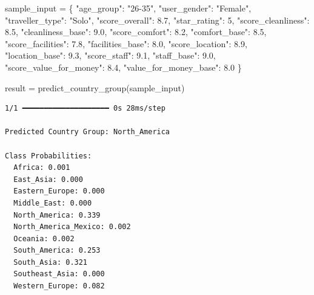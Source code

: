 \documentclass[
  letterpaper,
  DIV=11,
  numbers=noendperiod]{scrartcl}
\newenvironment{Shaded}{\begin{snugshade}}{\end{snugshade}}
\newcommand{\DecValTok}[1]{\textcolor[rgb]{0.68,0.00,0.00}{#1}}
\newcommand{\FloatTok}[1]{\textcolor[rgb]{0.68,0.00,0.00}{#1}}
\newcommand{\NormalTok}[1]{\textcolor[rgb]{0.00,0.23,0.31}{#1}}
\newcommand{\OperatorTok}[1]{\textcolor[rgb]{0.37,0.37,0.37}{#1}}
\newcommand{\StringTok}[1]{\textcolor[rgb]{0.13,0.47,0.30}{#1}}
\begin{document}
\begin{Shaded}
\begin{Highlighting}[]
\NormalTok{sample\_input }\OperatorTok{=}\NormalTok{ \{}
    \StringTok{"age\_group"}\NormalTok{: }\StringTok{"26{-}35"}\NormalTok{,}
    \StringTok{"user\_gender"}\NormalTok{: }\StringTok{"Female"}\NormalTok{,}
    \StringTok{"traveller\_type"}\NormalTok{: }\StringTok{"Solo"}\NormalTok{,}
    \StringTok{"score\_overall"}\NormalTok{: }\FloatTok{8.7}\NormalTok{,}
    \StringTok{"star\_rating"}\NormalTok{: }\DecValTok{5}\NormalTok{,}
    \StringTok{"score\_cleanliness"}\NormalTok{: }\FloatTok{8.5}\NormalTok{,}
    \StringTok{"cleanliness\_base"}\NormalTok{: }\FloatTok{9.0}\NormalTok{,}
    \StringTok{"score\_comfort"}\NormalTok{: }\FloatTok{8.2}\NormalTok{,}
    \StringTok{"comfort\_base"}\NormalTok{: }\FloatTok{8.5}\NormalTok{,}
    \StringTok{"score\_facilities"}\NormalTok{: }\FloatTok{7.8}\NormalTok{,}
    \StringTok{"facilities\_base"}\NormalTok{: }\FloatTok{8.0}\NormalTok{,}
    \StringTok{"score\_location"}\NormalTok{: }\FloatTok{8.9}\NormalTok{,}
    \StringTok{"location\_base"}\NormalTok{: }\FloatTok{9.3}\NormalTok{,}
    \StringTok{"score\_staff"}\NormalTok{: }\FloatTok{9.1}\NormalTok{,}
    \StringTok{"staff\_base"}\NormalTok{: }\FloatTok{9.0}\NormalTok{,}
    \StringTok{"score\_value\_for\_money"}\NormalTok{: }\FloatTok{8.4}\NormalTok{,}
    \StringTok{"value\_for\_money\_base"}\NormalTok{: }\FloatTok{8.0}
\NormalTok{\}}

\NormalTok{result }\OperatorTok{=}\NormalTok{ predict\_country\_group(sample\_input)}
\end{Highlighting}
\end{Shaded}

\begin{verbatim}
1/1 ━━━━━━━━━━━━━━━━━━━━ 0s 28ms/step

Predicted Country Group: North_America

Class Probabilities:
  Africa: 0.001
  East_Asia: 0.000
  Eastern_Europe: 0.000
  Middle_East: 0.000
  North_America: 0.339
  North_America_Mexico: 0.002
  Oceania: 0.002
  South_America: 0.253
  South_Asia: 0.321
  Southeast_Asia: 0.000
  Western_Europe: 0.082
\end{verbatim}
\end{document}
